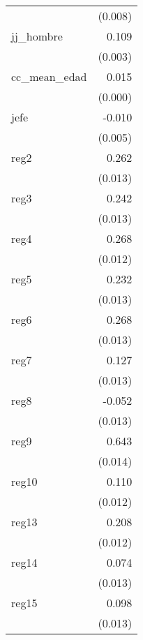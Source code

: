 {\begin{longtable}{l*{1}{D{.}{.}{-1}}}
            &     (0.008)         \\
\addlinespace
jj\_hombre   &       0.109\sym{***}\\
            &     (0.003)         \\
\addlinespace
cc\_mean\_edad&       0.015\sym{***}\\
            &     (0.000)         \\
\addlinespace
jefe        &      -0.010\sym{*}  \\
            &     (0.005)         \\
\addlinespace
reg2        &       0.262\sym{***}\\
            &     (0.013)         \\
\addlinespace
reg3        &       0.242\sym{***}\\
            &     (0.013)         \\
\addlinespace
reg4        &       0.268\sym{***}\\
            &     (0.012)         \\
\addlinespace
reg5        &       0.232\sym{***}\\
            &     (0.013)         \\
\addlinespace
reg6        &       0.268\sym{***}\\
            &     (0.013)         \\
\addlinespace
reg7        &       0.127\sym{***}\\
            &     (0.013)         \\
\addlinespace
reg8        &      -0.052\sym{***}\\
            &     (0.013)         \\
\addlinespace
reg9        &       0.643\sym{***}\\
            &     (0.014)         \\
\addlinespace
reg10       &       0.110\sym{***}\\
            &     (0.012)         \\
\addlinespace
reg13       &       0.208\sym{***}\\
            &     (0.012)         \\
\addlinespace
reg14       &       0.074\sym{***}\\
            &     (0.013)         \\
\addlinespace
reg15       &       0.098\sym{***}\\
            &     (0.013)         \\

\end{longtable}}
